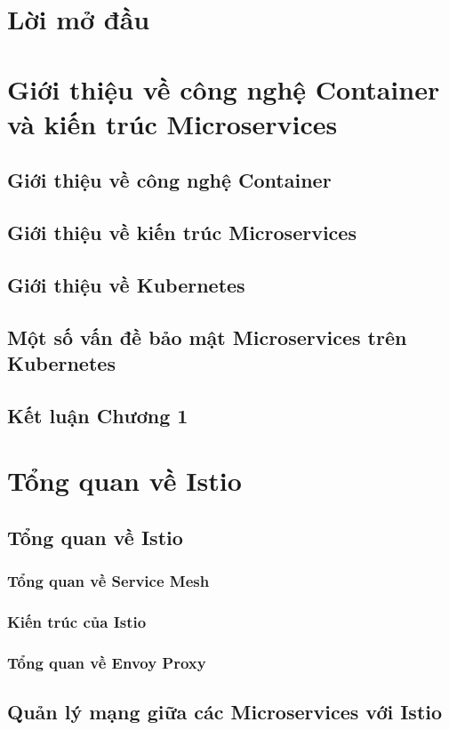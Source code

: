 \documentclass[12pt,a4paper]{report}
\begin{document}
	\chapter*{Lời mở đầu}
	
	
	\chapter{Giới thiệu về công nghệ Container và kiến trúc Microservices}
		\section{Giới thiệu về công nghệ Container}
		\section{Giới thiệu về kiến trúc Microservices}
		\section{Giới thiệu về Kubernetes}
		\section{Một số vấn đề bảo mật Microservices trên Kubernetes}
		\section*{Kết luận Chương 1}
	
	\chapter{Tổng quan về Istio}
		\section{Tổng quan về Istio}
			\subsection{Tổng quan về Service Mesh}
			\subsection{Kiến trúc của Istio}
		\subsection{Tổng quan về Envoy Proxy}
		\section{Quản lý mạng giữa các Microservices với Istio}
\end{document}
